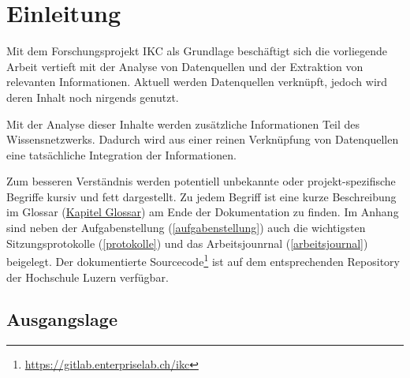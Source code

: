 

\chapter{Einleitung}



Mit dem Forschungsprojekt \gls{IKC} als Grundlage beschäftigt sich die vorliegende Arbeit vertieft mit der Analyse von Datenquellen und der Extraktion von relevanten Informationen. Aktuell werden Datenquellen verknüpft, jedoch wird deren Inhalt noch nirgends genutzt. 

Mit der Analyse dieser Inhalte werden zusätzliche Informationen Teil des Wissensnetzwerks. Dadurch wird aus einer reinen Verknüpfung von Datenquellen eine tatsächliche Integration der Informationen.



Zum besseren Verständnis werden potentiell unbekannte oder pro\-jekt-spezifische Begriffe kursiv und fett dargestellt. Zu jedem Begriff ist eine kurze Beschreibung im Glossar (\hyperref[glossar]{Kapitel Glossar}) am Ende der Dokumentation zu finden. Im Anhang sind neben der Aufgabenstellung (\autoref{aufgabenstellung}) auch die wichtigsten Sitzungsprotokolle (\autoref{protokolle}) und das Arbeitsjounrnal (\autoref{arbeitsjournal}) beigelegt. Der dokumentierte Sourcecode\footnote{\url{https://gitlab.enterpriselab.ch/ikc}} ist auf dem entsprechenden Repository der Hochschule Luzern verfügbar.


\section{Ausgangslage}




